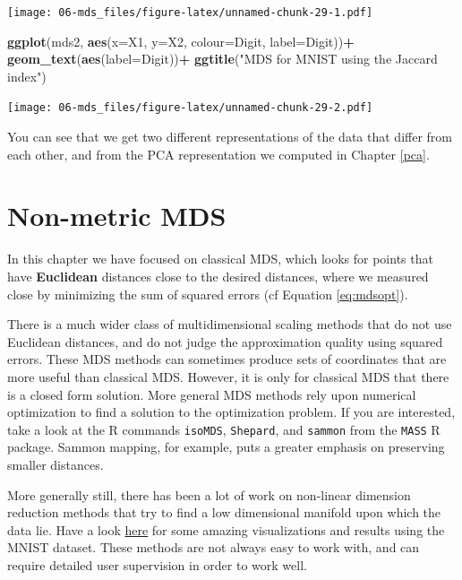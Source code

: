 \documentclass[
]{book}
\newenvironment{Shaded}{\begin{snugshade}}{\end{snugshade}}
\newcommand{\AttributeTok}[1]{\textcolor[rgb]{0.13,0.29,0.53}{#1}}
\newcommand{\FunctionTok}[1]{\textcolor[rgb]{0.13,0.29,0.53}{\textbf{#1}}}
\newcommand{\NormalTok}[1]{#1}
\newcommand{\SpecialCharTok}[1]{\textcolor[rgb]{0.81,0.36,0.00}{\textbf{#1}}}
\newcommand{\StringTok}[1]{\textcolor[rgb]{0.31,0.60,0.02}{#1}}
\theoremstyle{definition}
\theoremstyle{definition}
\theoremstyle{definition}
\theoremstyle{definition}
\theoremstyle{remark}
\begin{document}
\texttt{[image: 06-mds\_files/figure-latex/unnamed-chunk-29-1.pdf]}

\begin{Shaded}
\begin{Highlighting}[]
\FunctionTok{ggplot}\NormalTok{(mds2, }\FunctionTok{aes}\NormalTok{(}\AttributeTok{x=}\NormalTok{X1, }\AttributeTok{y=}\NormalTok{X2, }\AttributeTok{colour=}\NormalTok{Digit, }\AttributeTok{label=}\NormalTok{Digit))}\SpecialCharTok{+}
  \FunctionTok{geom\_text}\NormalTok{(}\FunctionTok{aes}\NormalTok{(}\AttributeTok{label=}\NormalTok{Digit))}\SpecialCharTok{+} 
  \FunctionTok{ggtitle}\NormalTok{(}\StringTok{"MDS for MNIST using the Jaccard index"}\NormalTok{) }
\end{Highlighting}
\end{Shaded}

\texttt{[image: 06-mds\_files/figure-latex/unnamed-chunk-29-2.pdf]}

You can see that we get two different representations of the data that differ from each other, and from the PCA representation we computed in Chapter \ref{pca}.

\hypertarget{non-metric-mds}{%
\section{Non-metric MDS}\label{non-metric-mds}}

In this chapter we have focused on classical MDS, which looks for points that have \textbf{Euclidean} distances close to the desired distances, where we measured close by minimizing the sum of squared errors (cf Equation \eqref{eq:mdsopt}).

There is a much wider class of multidimensional scaling methods that do not use Euclidean distances, and do not judge the approximation quality using squared errors. These MDS methods can sometimes produce sets of coordinates that are more useful than classical MDS. However, it is only for classical MDS that there is a closed form solution. More general MDS methods rely upon numerical optimization to find a solution to the optimization problem. If you are interested, take a look at the R commands \texttt{isoMDS}, \texttt{Shepard}, and \texttt{sammon} from the \texttt{MASS} R package. Sammon mapping, for example, puts a greater emphasis on preserving smaller distances.

More generally still, there has been a lot of work on non-linear dimension reduction methods that try to find a low dimensional manifold upon which the data lie. Have a look \href{https://colah.github.io/posts/2014-10-Visualizing-MNIST/}{here} for some amazing visualizations and results using the MNIST dataset. These methods are not always easy to work with, and can require detailed user supervision in order to work well.
\end{document}
